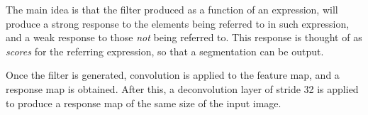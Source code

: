 The main idea is that the filter produced as a function of an expression, will produce a strong response to the elements being referred to in such expression, and a weak response to those \textit{not} being referred to. This response is thought of as \textit{scores} for the referring expression, so that a segmentation can be output.

Once the filter is generated, convolution is applied to the feature map, and a response map is obtained. After this, a deconvolution layer of stride 32 is applied to produce a response map of the same size of the input image.






